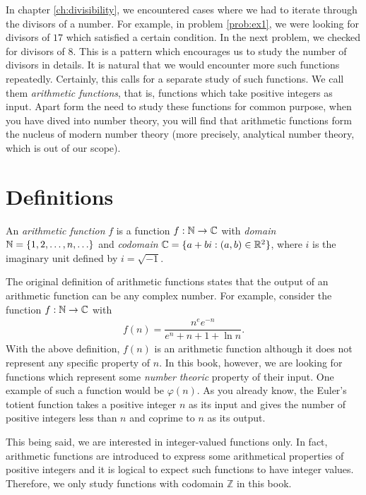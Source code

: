 \documentclass[12pt]{subfile}
\begin{document}
	In chapter \eqref{ch:divisibility}, we encountered cases where we had to iterate through the divisors of a number. For example, in problem \eqref{prob:ex1}, we were looking for divisors of $17$ which satisfied a certain condition. In the next problem, we checked for divisors of $8$. This is a pattern which encourages us to study the number of divisors in details. It is natural that we would encounter more such functions repeatedly. Certainly, this calls for a separate study of such functions. We call them \textit{arithmetic functions}, that is, functions which take positive integers as input. Apart form the need to study these functions for common purpose, when you have dived into number theory, you will find that arithmetic functions form the nucleus of modern number theory (more precisely, analytical number theory, which is out of our scope)\watermark.
\section{Definitions}
	
		\begin{definition}
			An \textit{arithmetic function} $f$ is a function $f : \mathbb{N} \to \mathbb{C} $ with \textit{domain} $\mathbb{N} = \{1, 2, \ldots, n, \ldots\}$ and \textit{codomain} $\mathbb{C} = \{a+bi: (a,b)\in \mathbb{R}^2 \}$, where $i$ is the imaginary unit defined by $i=\sqrt{-1}$.
		\end{definition}
		
		\begin{remark}
			The original definition of arithmetic functions states that the output of an arithmetic function can be any complex number. For example, consider the function $f:\mathbb{N}\to \mathbb{C}$ with
				\begin{align*}
					f(n)=\dfrac{n^ee^{-n}}{e^n+n+1+\ln n}.
				\end{align*}
			With the above definition, $f(n)$ is an arithmetic function although it does not represent any specific property of $n$. In this book, however, we are looking for functions which represent some \textit{number theoric} property of their input. One example of such a function would be $\varphi(n)$. As you already know, the Euler's totient function takes a positive integer $n$ as its input and gives the number of positive integers less than $n$ and coprime to $n$ as its output. 
			
			This being said, we are interested in integer-valued functions only. In fact, arithmetic functions are introduced to express some arithmetical properties of positive integers and it is logical to expect such functions to have integer values. Therefore, we only study functions with codomain $\mathbb Z$ in this book.
		\end{remark}
		
\end{document}
